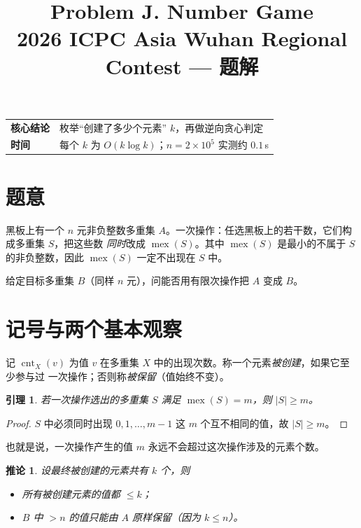 \documentclass[11pt,a4paper]{article}
\title{\bfseries Problem J. Number Game\\[2pt]\large 2026 ICPC Asia Wuhan Regional Contest --- 题解}
\author{}
\date{}
\newtheorem{lemma}{引理}
\newtheorem{corollary}{推论}
\begin{document}
\maketitle
\vspace{-1.4em}

\begin{center}
\small
\begin{tabular}{ll}
\textbf{核心结论} & 枚举“创建了多少个元素” $k$，再做逆向贪心判定 \\
\textbf{时间} & 每个 $k$ 为 $O(k\log k)$；$n=2\times10^5$ 实测约 $0.1$\,s \\
\end{tabular}
\end{center}

\section{题意}

黑板上有一个 $n$ 元非负整数多重集 $A$。一次操作：任选黑板上的若干数，它们构成多重集 $S$，把这些数
\emph{同时}改成 $\operatorname{mex}(S)$。其中 $\operatorname{mex}(S)$ 是最小的不属于 $S$ 的非负整数，因此
$\operatorname{mex}(S)$ 一定不出现在 $S$ 中。

给定目标多重集 $B$（同样 $n$ 元），问能否用有限次操作把 $A$ 变成 $B$。

\section{记号与两个基本观察}

记 $\operatorname{cnt}_X(v)$ 为值 $v$ 在多重集 $X$ 中的出现次数。称一个元素\emph{被创建}，如果它至少参与过
一次操作；否则称\emph{被保留}（值始终不变）。

\begin{lemma}
若一次操作选出的多重集 $S$ 满足 $\operatorname{mex}(S)=m$，则 $|S|\ge m$。
\end{lemma}
\begin{proof}
$S$ 中必须同时出现 $0,1,\dots,m-1$ 这 $m$ 个互不相同的值，故 $|S|\ge m$。
\end{proof}

也就是说，一次操作产生的值 $m$ 永远不会超过这次操作涉及的元素个数。

\begin{corollary}
设最终被创建的元素共有 $k$ 个，则
\begin{itemize}
  \item 所有被创建元素的值都 $\le k$；
  \item $B$ 中 $>n$ 的值只能由 $A$ 原样保留（因为 $k\le n$）。
\end{itemize}
\end{corollary}
\end{document}
